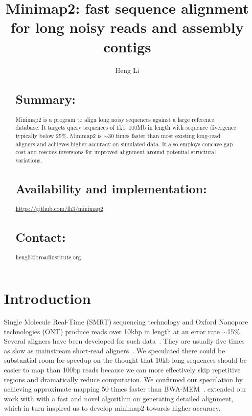 \documentclass{bioinfo}
\begin{document}

\title[Long-read and assembly alignment with minimap2]{Minimap2: fast sequence alignment for long noisy reads and assembly contigs}
\author[Li]{Heng Li}
\address{Broad Institute, 415 Main Street, Cambridge, MA 02142, USA}

\maketitle

\begin{abstract}
\section{Summary:} Minimap2 is a program to align long noisy sequences against
a large reference database. It targets query sequences of 1kb--100Mb in length
with sequence divergence typically below 25\%. Minimap2 is $\sim$30 times
faster than most existing long-read aligners and achieves higher accuracy on
simulated data. It also employs concave gap cost and rescues inversions for
improved alignment around potential structural variations.

\section{Availability and implementation:}
\href{https://github.com/lh3/minimap2}{https://github.com/lh3/minimap2}

\section{Contact:} hengli@broadinstitute.org
\end{abstract}

\section{Introduction}

Single Molecule Real-Time (SMRT) sequencing technology and Oxford Nanopore
technologies (ONT) produce reads over 10kbp in length at an error rate
$\sim$15\%. Several aligners have been developed for such
data~\citep{Chaisson:2012aa,Li:2013aa,Liu:2016ab,Sovic:2016aa,Liu:2017aa,Lin:2017aa}.
They are usually five times as slow as mainstream short-read
aligners~\citep{Langmead:2012fk,Li:2013aa}. We speculated there could be
substantial room for speedup on the thought that 10kb long sequences should be
easier to map than 100bp reads because we can more effectively skip repetitive
regions and dramatically reduce computation. We confirmed our speculation by
achieving approximate mapping 50 times faster than BWA-MEM~\citep{Li:2016aa}.
\citet{Suzuki:2016} extended our work with with a fast and novel algorithm on
generating detailed alignment, which in turn inspired us to develop minimap2
towards higher accuracy.
\end{document}
